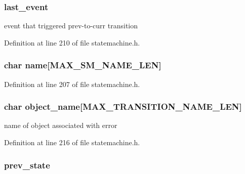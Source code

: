 \hypertarget{struct__state__table_ad112b231e51775715b689dad71491f10}{
\subsubsection[{last\-\_\-event}]{ last\-\_\-event}}\label{struct__state__table_ad112b231e51775715b689dad71491f10}


event that triggered prev-\/to-\/curr transition 



Definition at line 210 of file statemachine.\-h.

\hypertarget{struct__state__table_aef62a5c3d3f28b912cb9864df5c8cd4f}{
\subsubsection[{name}]{\setlength{\rightskip}{0pt plus 5cm}char name\mbox{[}{\bf M\-A\-X\-\_\-\-S\-M\-\_\-\-N\-A\-M\-E\-\_\-\-L\-E\-N}\mbox{]}}}\label{struct__state__table_aef62a5c3d3f28b912cb9864df5c8cd4f}


Definition at line 207 of file statemachine.\-h.

\hypertarget{struct__state__table_a559a3e26f02300e699f580595fcf06c0}{
\subsubsection[{object\-\_\-name}]{\setlength{\rightskip}{0pt plus 5cm}char object\-\_\-name\mbox{[}{\bf M\-A\-X\-\_\-\-T\-R\-A\-N\-S\-I\-T\-I\-O\-N\-\_\-\-N\-A\-M\-E\-\_\-\-L\-E\-N}\mbox{]}}}\label{struct__state__table_a559a3e26f02300e699f580595fcf06c0}


name of object associated with error 



Definition at line 216 of file statemachine.\-h.

\hypertarget{struct__state__table_a1013e51e490d3d448cb2c1475ff12b72}{
\subsubsection[{prev\-\_\-state}]{ prev\-\_\-state}}\label{struct__state__table_a1013e51e490d3d448cb2c1475ff12b72}


